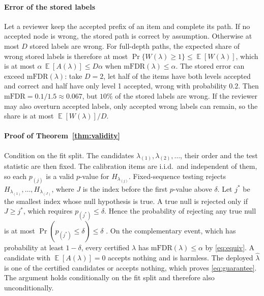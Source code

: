 \documentclass[preprint,12pt]{elsarticle}
\theoremstyle{definition}
\newcommand{\fdr}{\mathrm{mFDR}}
\DeclareMathOperator{\E}{\mathbb{E}}
\begin{document}
\paragraph{Error of the stored labels}
Let a reviewer keep the accepted prefix of an item and complete its path. If no
accepted node is wrong, the stored path is correct by assumption. Otherwise at
most $D$ stored labels are wrong. For full-depth paths, the expected share of
wrong stored labels is therefore at most $\Pr\{W(\lambda)\ge1\}\le\E[W(\lambda)]$, which is at most
$\alpha\,\E[A(\lambda)]\le D\alpha$ when $\fdr(\lambda)\le\alpha$. The stored error can
exceed $\fdr(\lambda)$: take $D=2$, let half of the items have both levels
accepted and correct and half have only level 1 accepted, wrong with
probability $0.2$. Then $\fdr=0.1/1.5\approx0.067$, but $10\%$ of the stored
labels are wrong. If the reviewer may also overturn accepted labels, only
accepted wrong labels can remain, so the share is at most $\E[W(\lambda)]/D$.

\paragraph{Proof of Theorem~\ref{thm:validity}}
Condition on the fit split. The candidates $\lambda_{(1)},\lambda_{(2)},\dots$,
their order and the test statistic are then fixed. The calibration items are
i.i.d.\ and independent of them, so each $p_{(j)}$ is a valid $p$-value for
$H_{\lambda_{(j)}}$. Fixed-sequence testing rejects $H_{\lambda_{(1)}},\dots,
H_{\lambda_{(J)}}$, where $J$ is the index before the first $p$-value above
$\delta$. Let $j^\ast$ be the smallest index whose null hypothesis is true. A
true null is rejected only if $J\ge j^\ast$, which requires
$p_{(j^\ast)}\le\delta$. Hence the probability of rejecting any true null is at
most $\Pr(p_{(j^\ast)}\le\delta)\le\delta$ \citep{bauer1991multiple}. On the
complementary event, which has probability at least $1-\delta$, every certified
$\lambda$ has $\fdr(\lambda)\le\alpha$ by \eqref{eq:equiv}. A candidate with
$\E[A(\lambda)]=0$ accepts nothing and is harmless. The deployed $\hat\lambda$
is one of the certified candidates or accepts nothing, which proves
\eqref{eq:guarantee}. The argument holds conditionally on the fit split and
therefore also unconditionally.

\clearpage




\end{document}
